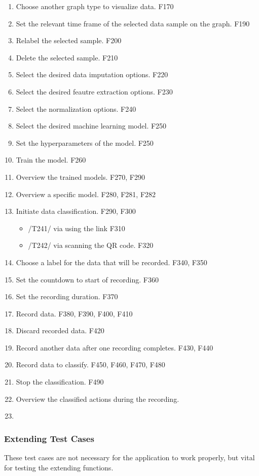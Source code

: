 \begin{enumerate}[{label = \textbf{/T{\protect\twodigits{\arabic{enumi}}}0/}, leftmargin = *}]
    \item Choose another graph type to visualize data. F170
    \item Set the relevant time frame of the selected data sample on the graph. F190
    \item Relabel the selected sample. F200
    \item Delete the selected sample. F210
    \item Select the desired data imputation options. F220
    \item Select the desired feautre extraction options. F230
    \item Select the normalization options. F240
    \item Select the desired machine learning model. F250
    \item Set the hyperparameters of the model. F250
    \item Train the model. F260
    \item Overview the trained models. F270, F290
    \item Overview a specific model. F280, F281, F282
    \item Initiate data classification. F290, F300
    \begin{itemize}
        \item /T241/ via using the link F310
        \item /T242/ via scanning the QR code. F320
    \end{itemize}
    \item Choose a label for the data that will be recorded. F340, F350
    \item Set the countdown to start of recording. F360
    \item Set the recording duration. F370
    \item Record data. F380, F390, F400, F410
    \item Discard recorded data. F420
    \item Record another data after one recording completes. F430, F440
    \item Record data to classify. F450, F460, F470, F480
    \item Stop the classification. F490
    \item Overview the classified actions during the recording. 
    \item 
\end{enumerate}
\subsubsection{Extending Test Cases}
These test cases are not necessary for the application to work properly, but vital for testing the extending functions. 
